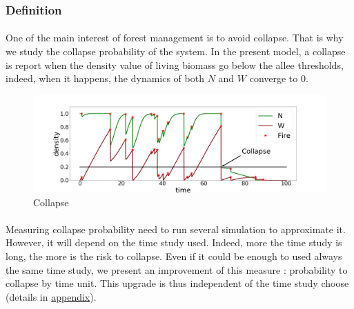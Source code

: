 \documentclass{article}
\begin{document}
\subsubsection{Definition}
\label{collapse_probability}
\paragraph{}
One of the main interest of forest management is to avoid collapse. That is why we study the collapse probability of the system. In the present model, a collapse is report when the density value of living biomass go below the allee thresholds, indeed, when it happens, the dynamics of both $N$ and $W$ converge to $0$.



\newpage

\begin{figure}[h!]
\centering
\includegraphics[width=12.cm]{time_series_cp_1.png}
\caption{Collapse}
\end{figure}


\paragraph{} 
Measuring collapse probability need to run several simulation to approximate it. However, it will depend on the time study used. Indeed, more the time study is long, the more is the risk to collapse. Even if it could be enough to used always the same time study, we present an improvement of this measure : probability to collapse by time unit. This upgrade is thus independent of the time study choose (details in \hyperref[proba_per_time_unit]{appendix}).
\end{document}
